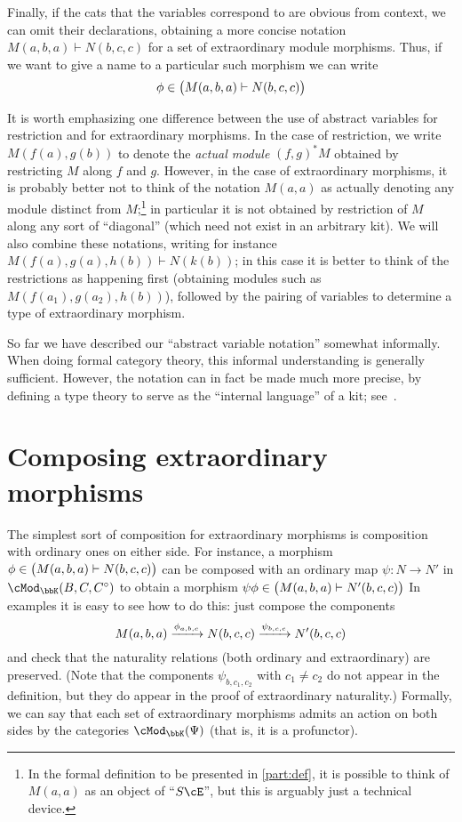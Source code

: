 \documentclass{amsart}
\newcommand{\E}{\cE}
\newcommand{\K}{\bbK}
\let\mod\cMod
\def\modk{\mod_\K}
\renewcommand{\o}{^{\circ}}
\let\mto\vdash    %
\def\mhom#1#2{\left( #1 \vphantom{\big|}\mto #2 \right)}
\begin{document}
Finally, if the cats that the variables correspond to are obvious from context, we can omit their declarations, obtaining a more concise notation $M(a,b,a) \mto N(b,c,c)$ for a set of extraordinary module morphisms.
Thus, if we want to give a name to a particular such morphism we can write
\[ \phi \in \mhom{M(a,b,a)}{N(b,c,c)} \]

It is worth emphasizing one difference between the use of abstract variables for restriction and for extraordinary morphisms.
In the case of restriction, we write $M(f(a),g(b))$ to denote the \emph{actual module} $(f,g)^*M$ obtained by restricting $M$ along $f$ and $g$.
However, in the case of extraordinary morphisms, it is probably better not to think of the notation $M(a,a)$ as actually denoting any module distinct from $M$;\footnote{In the formal definition to be presented in \cref{part:def}, it is possible to think of $M(a,a)$ as an object of ``$S\E$'', but this is arguably just a technical device.} in particular it is not obtained by restriction of $M$ along any sort of ``diagonal'' (which need not exist in an arbitrary kit).
We will also combine these notations, writing for instance $M(f(a),g(a),h(b))\mto N(k(b))$; in this case it is better to think of the restrictions as happening first (obtaining modules such as $M(f(a_1),g(a_2),h(b))$), followed by the pairing of variables to determine a type of extraordinary morphism.

So far we have described our ``abstract variable notation'' somewhat informally.
When doing formal category theory, this informal understanding is generally sufficient.
However, the notation can in fact be made much more precise, by defining a type theory to serve as the ``internal language'' of a kit; see~\cite{lnss:dirtt}.

\section{Composing extraordinary morphisms}
\label{sec:composing}

The simplest sort of composition for extraordinary morphisms is composition with ordinary ones on either side.
For instance, a morphism $\phi\in \mhom{M(a,b,a)}{N(b,c,c)}$ can be composed with an ordinary map $\psi:N\to N'$ in $\modk(B,C,C\o)$ to obtain a morphism $\psi\phi\in \mhom{M(a,b,a)}{N'(b,c,c)}$
In examples it is easy to see how to do this: just compose the components
\[ M(a,b,a) \xrightarrow{\phi_{a,b,c}} N(b,c,c) \xrightarrow{\psi_{b,c,c}} N'(b,c,c) \]
and check that the naturality relations (both ordinary and extraordinary) are preserved.
(Note that the components $\psi_{b,c_1,c_2}$ with $c_1\neq c_2$ do not appear in the definition, but they do appear in the proof of extraordinary naturality.)
Formally, we can say that each set of extraordinary morphisms admits an action on both sides by the categories $\modk(\Psi)$ (that is, it is a profunctor).
\end{document}
